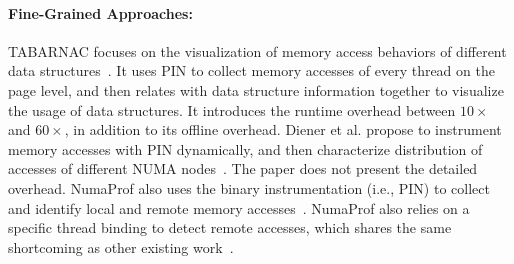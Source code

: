 \paragraph{Fine-Grained Approaches:} 
TABARNAC focuses on the visualization of memory access behaviors of different data structures~\cite{TABARNAC}. It uses PIN to collect memory accesses of every thread on the page level, and then relates with data structure information together to visualize the usage of data structures. It introduces the runtime overhead between $10\times$ and $60\times$, in addition to its offline overhead. Diener et al. propose to instrument memory accesses with PIN dynamically, and then characterize distribution of accesses of different NUMA nodes~\cite{diener2015characterizing}. The paper does not present the detailed overhead. 
NumaProf also uses the binary instrumentation  (i.e., PIN) to collect and identify local and remote memory accesses~\cite{valat:2018:numaprof}.  NumaProf also relies on a specific thread binding to detect remote accesses, which shares the same shortcoming as other existing work~\cite{XuNuma, 7847070}.   




